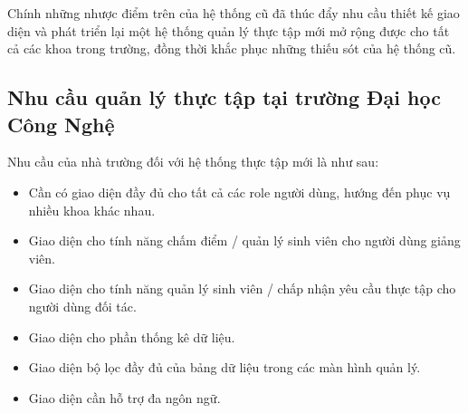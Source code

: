 \documentclass[./../main.tex]{subfiles}
\begin{document}
Chính những nhược điểm trên của hệ thống cũ đã thúc đẩy nhu cầu thiết kế giao diện và phát triển lại một hệ thống quản lý thực tập mới mở rộng được cho tất cả các khoa trong trường, đồng thời khắc phục những thiếu sót của hệ thống cũ.

\subsection{Nhu cầu quản lý thực tập tại trường Đại học Công Nghệ}

Nhu cầu của nhà trường đối với hệ thống thực tập mới là như sau:

\begin{itemize}
	\item

	      Cần có giao diện đầy đủ cho tất cả các role người dùng, hướng đến phục vụ nhiều khoa khác nhau.

	\item

	      Giao diện cho tính năng chấm điểm / quản lý sinh viên cho người dùng giảng
	      viên.

	\item

	      Giao diện cho tính năng quản lý sinh viên / chấp nhận yêu cầu thực tập cho
	      người dùng đối tác.

	\item

	      Giao diện cho phần thống kê dữ liệu.

	\item

	      Giao diện bộ lọc đầy đủ của bảng dữ liệu trong các màn hình quản lý.
	\item Giao diện cần hỗ trợ đa ngôn ngữ.
\end{itemize}
\end{document}

